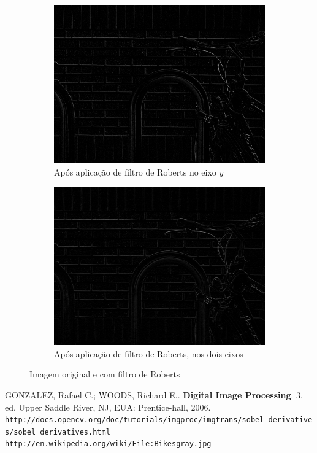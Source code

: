 \documentclass[10pt,a4paper]{article}
\begin{document}
\begin{figure}[!ht]
\begin{subfigure}[ht]{0.45\textwidth}
        \includegraphics[width=\textwidth]{roberts_y.jpg}
        \caption{\centering Após aplicação de filtro de Roberts no eixo $y$}
        \label{fig:roberts_y}
    \end{subfigure}
    \qquad
    \begin{subfigure}[ht]{0.45\textwidth}
        \includegraphics[width=\textwidth]{roberts.jpg}
        \caption{\centering Após aplicação de filtro de Roberts, nos dois eixos}
        \label{fig:roberts}
    \end{subfigure}
    \caption{Imagem original e com filtro de Roberts}
    \label{fig:rob}
\end{figure}

\begin{thebibliography}{99}
     GONZALEZ, Rafael C.; WOODS, Richard E.. \textbf{Digital Image Processing}. 3. ed. Upper Saddle River, NJ, EUA: Prentice-hall, 2006.
     \texttt{http://docs.opencv.org/doc/tutorials/imgproc/imgtrans/sobel\_derivatives/sobel\_derivatives.html}
     \texttt{http://en.wikipedia.org/wiki/File:Bikesgray.jpg}
\end{thebibliography}
\end{document}
